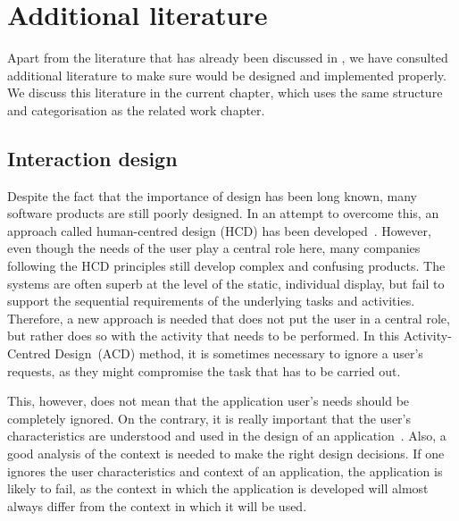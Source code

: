 \chapter{Additional literature}

Apart from the literature that has already been discussed in , we have consulted additional literature to make sure \oframp{} would be designed and implemented properly. We discuss this literature in the current chapter, which uses the same structure and categorisation as the related work chapter.



\section{Interaction design}
Despite the fact that the importance of design has been long known, many software products are still poorly designed. In an attempt to overcome this, an approach called human-centred design (HCD) has been developed~\cite{norman2005human}. However, even though the needs of the user play a central role here, many companies following the HCD principles still develop complex and confusing products. The systems are often superb at the level of the static, individual display, but fail to support the sequential requirements of the underlying tasks and activities. Therefore, a new approach is needed that does not put the user in a central role, but rather does so with the activity that needs to be performed. In this Activity-Centred Design~(ACD) method, it is sometimes necessary to ignore a user's requests, as they might compromise the task that has to be carried out.

This, however, does not mean that the application user's needs should be completely ignored. On the contrary, it is really important that the user's characteristics are understood and used in the design of an application~\cite{badre2002shaping}. Also, a good analysis of the context is needed to make the right design decisions. If one ignores the user characteristics and context of an application, the application is  likely to fail, as the context in which the application is developed will almost always differ from the context in which it will be used.


